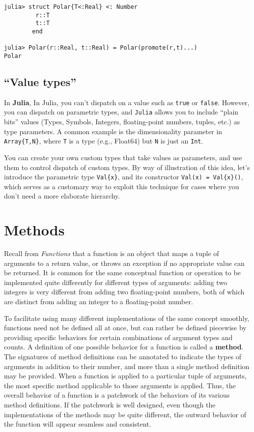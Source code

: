 \documentclass[
]{article}
\begin{document}
\begin{verbatim}
julia> struct Polar{T<:Real} <: Number
         r::T
         t::T
        end

julia> Polar(r::Real, t::Real) = Polar(promote(r,t)...)
Polar
\end{verbatim}

\hypertarget{value-types}{%
\subsection{``Value types''}\label{value-types}}

In \textbf{Julia}, In Julia, you can't dispatch on a value such as
\texttt{true} or \texttt{false}. However, you can dispatch on parametric
types, and \texttt{Julia} allows you to include ``plain bits'' values
(Types, Symbols, Integers, floating-point numbers, tuples, etc.) as type
parameters. A common example is the dimensionality parameter in
\texttt{Array\{T,N\}}, where \texttt{T} is a type (e.g., Float64) but
\texttt{N} is just an \texttt{Int}.

You can create your own custom types that take values as parameters, and
use them to control dispatch of custom types. By way of illustration of
this idea, let's introduce the parametric type \texttt{Val\{x\}}, and
its constructor \texttt{Val(x)\ =\ Val\{x\}()}, which serves as a
customary way to exploit this technique for cases where you don't need a
more elaborate hierarchy.

\newpage

\hypertarget{methods}{%
\section{Methods}\label{methods}}

Recall from \emph{Functions} that a function is an object that maps a
tuple of arguments to a return value, or throws an exception if no
appropriate value can be returned. It is common for the same conceptual
function or operation to be implemented quite differently for different
types of arguments: adding two integers is very different from adding
two floating-point numbers, both of which are distinct from adding an
integer to a floating-point number.

To facilitate using many different implementations of the same concept
smoothly, functions need not be defined all at once, but can rather be
defined piecewise by providing specific behaviors for certain
combinations of argument types and counts. A definition of one possible
behavior for a function is called a \textbf{method}. The signatures of
method definitions can be annotated to indicate the types of arguments
in addition to their number, and more than a single method definition
may be provided. When a function is applied to a particular tuple of
arguments, the most specific method applicable to those arguments is
applied. Thus, the overall behavior of a function is a patchwork of the
behaviors of its various method definitions. If the patchwork is well
designed, even though the implementations of the methods may be quite
different, the outward behavior of the function will appear seamless and
consistent.
\end{document}
